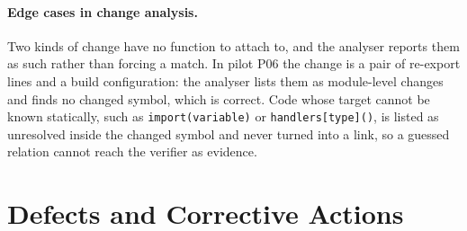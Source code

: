 \paragraph{Edge cases in change analysis.}
Two kinds of change have no function to attach to, and the analyser reports
them as such rather than forcing a match. In pilot P06 the change is a pair of
re-export lines and a build configuration: the analyser lists them as
module-level changes and finds no changed symbol, which is correct. Code whose
target cannot be known statically, such as \texttt{import(variable)} or
\texttt{handlers[type]()}, is listed as unresolved inside the changed symbol and
never turned into a link, so a guessed relation cannot reach the verifier as
evidence.

\section{Defects and Corrective Actions}
\label{sec:defects}

